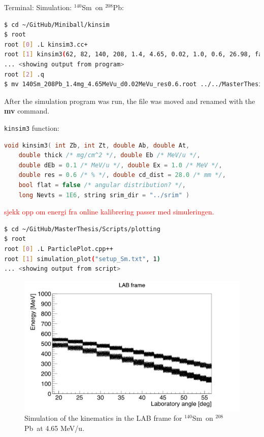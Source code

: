 \documentclass[twoside,english]{uiofysmaster/uiofysmaster}
\newcommand{\Sm}{$^{140}$Sm} %
\newcommand{\Pb}{$^{208}$Pb}
\begin{document}
Terminal: Simulation: \Sm\ on \Pb:
\begin{lstlisting}[language=sh]
$ cd ~/GitHub/Miniball/kinsim
$ root
root [0] .L kinsim3.cc+
root [1] kinsim3(62, 82, 140, 208, 1.4, 4.65, 0.02, 1.0, 0.6, 26.98, false, 1e6, "../SRIM")
... <showing output from program>
root [2] .q
$ mv 140Sm_208Pb_1.4mg_4.65MeVu_d0.02MeVu_res0.6.root ../../MasterThesis/Sorted_data/sim_140Sm_208Pb.root
\end{lstlisting}

After the simulation program was run, the file was moved and renamed with the \textbf{mv} command.





\texttt{kinsim3} function:
\begin{lstlisting}[language=c++]
void kinsim3( int Zb, int Zt, double Ab, double At, 
	double thick /* mg/cm^2 */, double Eb /* MeV/u */, 
	double dEb = 0.1 /* MeV/u */, double Ex = 1.0 /* MeV */, 
	double res = 0.6 /* % */, double cd_dist = 28.0 /* mm */, 
	bool flat = false /* angular distribution? */, 
	long Nevts = 1E6, string srim_dir = "../srim" )
\end{lstlisting}


\bigskip

\textcolor{red}{sjekk opp om energi fra online kalibrering passer med simuleringen.}




\begin{lstlisting}[language=sh]
$ cd ~/GitHub/MasterThesis/Scripts/plotting
$ root
root [0] .L ParticlePlot.cpp++
root [1] simulation_plot("setup_Sm.txt", 1)
... <showing output from script>
\end{lstlisting}


\begin{figure}[ht]
	\centering
    \includegraphics[width=\linewidth]{../Plots/simulation/kin_140Sm_208Pb.png}
	\caption{Simulation of the kinematics in the LAB frame for \Sm\ on \Pb\ at 4.65 MeV/u.}
	\label{fig:kinsim}
\end{figure}
\end{document}
